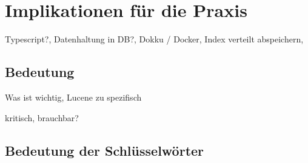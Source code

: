 
\section{Implikationen für die Praxis}

Typescript?, Datenhaltung in DB?, Dokku / Docker, Index verteilt abspeichern, 


\subsection{Bedeutung}

Was ist wichtig, Lucene zu spezifisch

kritisch, brauchbar?

\subsection{Bedeutung der Schlüsselwörter}